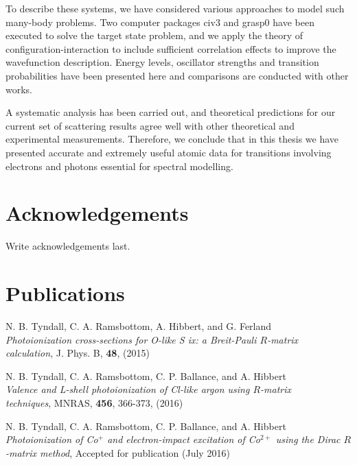 \documentclass[12pt, a4paper, oneside]{Thesis} %
\begin{document}
To describe these systems, we have considered various approaches to model such many-body problems. Two computer packages {\sc civ3} and {\sc grasp0} have been executed to solve the target state problem, and we apply the theory of configuration-interaction to include sufficient correlation effects to improve the wavefunction description. Energy levels, oscillator strengths and transition probabilities have been presented here and comparisons are conducted with other works.

A systematic analysis has been carried out, and theoretical predictions for our current set of scattering results agree well with other theoretical and experimental measurements. Therefore, we conclude that in this thesis we have presented accurate and extremely useful atomic data for transitions involving electrons and photons essential for spectral modelling.

\clearpage %





\chapter*{Acknowledgements} %
Write acknowledgements last.

\clearpage %

\chapter*{Publications}
\begin{itemize}
{\normalsize \item{N. B. Tyndall, C. A. Ramsbottom, A. Hibbert, and G. Ferland\\
\textit{Photoionization cross-sections for O-like S {\sc ix}: a Breit-Pauli $R$-matrix\\ calculation},
J. Phys. B, \textbf{48}, (2015)}
\item{N. B. Tyndall, C. A. Ramsbottom, C. P. Ballance, and A. Hibbert\\
\textit{Valence and L-shell photoionization of Cl-like argon using $R$-matrix\\ techniques},
MNRAS, \textbf{456}, 366-373, (2016)}
\item{N. B. Tyndall, C. A. Ramsbottom, C. P. Ballance, and A. Hibbert\\
\textit{Photoionization of Co$^+$ and electron-impact excitation of
Co$^{2+}$ using the Dirac $R$-matrix method},
Accepted for publication (July 2016)}}
\end{itemize}
\end{document}
